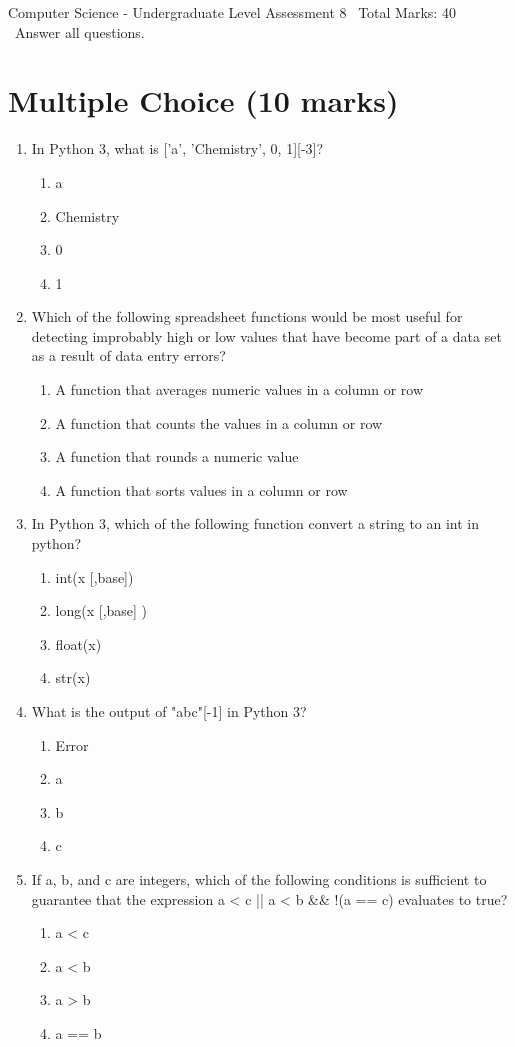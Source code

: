 \documentclass[12pt]{article}
\begin{document}
\begin{center}
Computer Science - Undergraduate Level Assessment 8 \
Total Marks: 40 \
Answer all questions.
\end{center}

\section*{Multiple Choice (10 marks)}
\begin{enumerate}[label=\arabic*.]
\item In Python 3, what is ['a', 'Chemistry', 0, 1][-3]?
\begin{enumerate}[label=(\alph*)]
    \item a
    \item Chemistry
    \item 0
    \item 1
\end{enumerate}
\item Which of the following spreadsheet functions would be most useful for detecting improbably high or low values that have become part of a data set as a result of data entry errors?
\begin{enumerate}[label=(\alph*)]
    \item A function that averages numeric values in a column or row
    \item A function that counts the values in a column or row
    \item A function that rounds a numeric value
    \item A function that sorts values in a column or row
\end{enumerate}
\item In Python 3, which of the following function convert a string to an int in python?
\begin{enumerate}[label=(\alph*)]
    \item int(x [,base])
    \item long(x [,base] )
    \item float(x)
    \item str(x)
\end{enumerate}
\item What is the output of "abc"[-1] in Python 3?
\begin{enumerate}[label=(\alph*)]
    \item Error
    \item a
    \item b
    \item c
\end{enumerate}
\item If a, b, and c are integers, which of the following conditions is sufficient to guarantee that the expression a \textless{} c || a \textless{} b \&\& !(a == c) evaluates to true?
\begin{enumerate}[label=(\alph*)]
    \item a \textless{} c
    \item a \textless{} b
    \item a \textgreater{} b
    \item a == b
\end{enumerate}
\end{enumerate}
\end{document}
